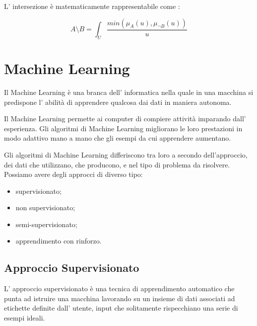 \documentclass[a4paper,12pt]{report}
\begin{document}
\begin{itemize}
L' intersezione è matematicamente rappresentabile come :

\begin{equation*}
    A \setminus B = \int_{U} \frac{min(\mu_A(u),\mu_{\neg B}(u))}{u}
\end{equation*}

\end{itemize}





\section{Machine Learning}
Il Machine Learning è una branca dell' informatica nella quale in una macchina si predispone l' abilità di apprendere qualcosa dai dati in maniera autonoma.

Il Machine Learning permette ai computer di compiere attività imparando dall' esperienza. \newline
Gli algoritmi di Machine Learning migliorano le loro prestazioni in modo adattivo mano a mano che gli esempi da cui apprendere aumentano.

%
%

\bigskip

Gli algoritmi di Machine Learning differiscono tra loro a secondo dell'approccio, dei dati che utilizzano, che producono, e nel tipo di problema da risolvere.
Possiamo avere degli approcci di diverso tipo:
\begin{itemize}
    \item supervisionato;
    \item non supervisionato;
    \item semi-supervisionato;
    \item apprendimento con rinforzo.
\end{itemize}

\subsection*{Approccio Supervisionato}
L' approccio supervisionato è una tecnica di apprendimento automatico che punta ad istruire una macchina lavorando su un insieme di dati associati ad etichette definite dall' utente, input che solitamente rispecchiano una serie di esempi ideali.
\end{document}
